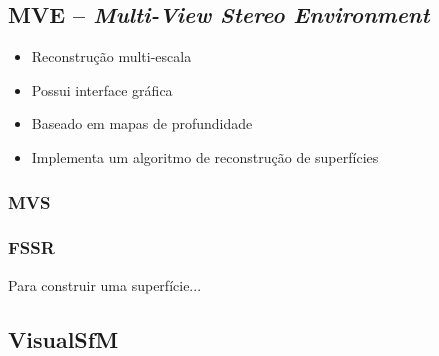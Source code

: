 \documentclass[table, usenames, svgnames, xcolor=dvipsnames]{beamer}
\begin{document}
\subsection{MVE -- \emph{Multi-View Stereo Environment}}

\begin{frame} 
	\begin{center}
		\begin{itemize}
		\item {Reconstrução multi-escala}
		\item {Possui interface gráfica}
		\item {Baseado em mapas de profundidade}
		\item {Implementa um algoritmo de reconstrução de superfícies}
		\end{itemize}
	\end{center}
\end{frame}

\subsubsection{MVS}

\begin{frame} 
	\begin{center}
		
	\end{center}
\end{frame}

\subsubsection{FSSR}

\begin{frame} 
	\begin{center}
Para construir uma superfície...
	\end{center}
\end{frame}


\subsection{VisualSfM}
\end{document}
